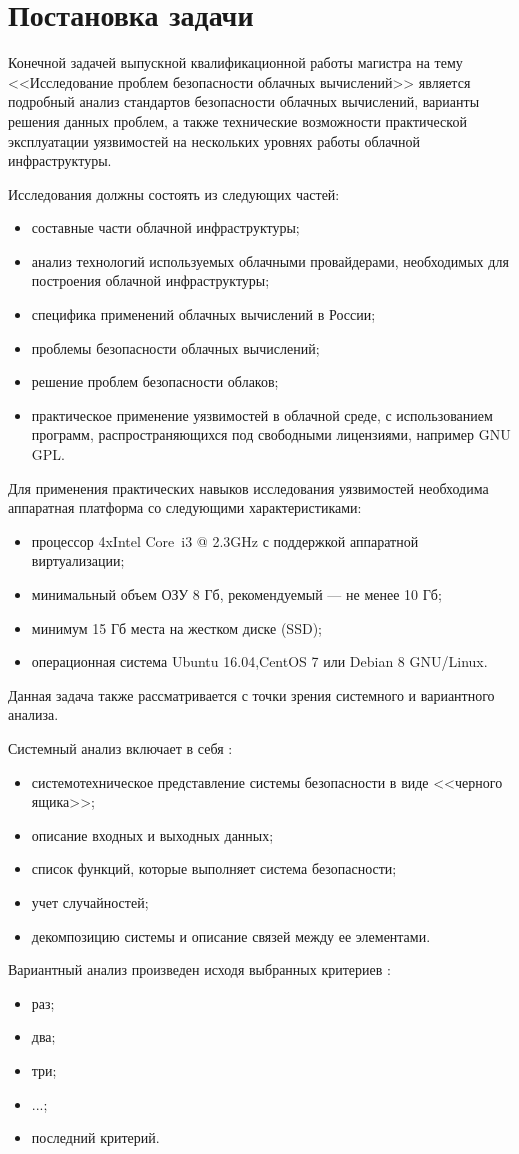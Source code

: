 \section{Постановка задачи}

Конечной задачей выпускной квалификационной работы магистра на тему <<Исследование проблем безопасности облачных вычислений>> является подробный анализ стандартов безопасности облачных вычислений, варианты решения данных проблем, а также технические возможности практической эксплуатации уязвимостей на нескольких уровнях работы облачной инфраструктуры.

Исследования должны состоять из следующих частей:
\begin{itemize}
  \item составные части облачной инфраструктуры;
  \item анализ технологий используемых облачными провайдерами, необходимых для построения облачной инфраструктуры;
  \item специфика применений облачных вычислений в России;
  \item проблемы безопасности облачных вычислений;
  \item решение проблем безопасности облаков;
  \item практическое применение уязвимостей в облачной среде, с использованием программ, распространяющихся под свободными лицензиями, например GNU GPL.
\end{itemize}

Для применения практических навыков исследования уязвимостей необходима аппаратная платформа со следующими характеристиками:
\begin{itemize}
  \item процессор 4xIntel Core\textregistered~i3 @ 2.3GHz с поддержкой аппаратной виртуализации;
  \item минимальный объем ОЗУ 8 Гб, рекомендуемый --- не менее 10 Гб;
  \item минимум 15 Гб места на жестком диске (SSD);
  \item операционная система Ubuntu 16.04,CentOS 7 или Debian 8 GNU/Linux.
\end{itemize}

Данная задача также рассматривается с точки зрения системного и вариантного анализа.

Системный анализ включает в себя \cite{sys-analyz}:
\begin{itemize}
  \item системотехническое представление системы безопасности в виде <<черного ящика>>;
  \item описание входных и выходных данных;
  \item список функций, которые выполняет система безопасности;
  \item учет случайностей;
  \item декомпозицию системы и описание связей между ее элементами.
\end{itemize}

Вариантный анализ произведен исходя выбранных критериев \cite{var-analyz}:
\begin{itemize}
  \item раз;
  \item два;
  \item три;
  \item ...;
  \item последний критерий.
\end{itemize}

\clearpage
